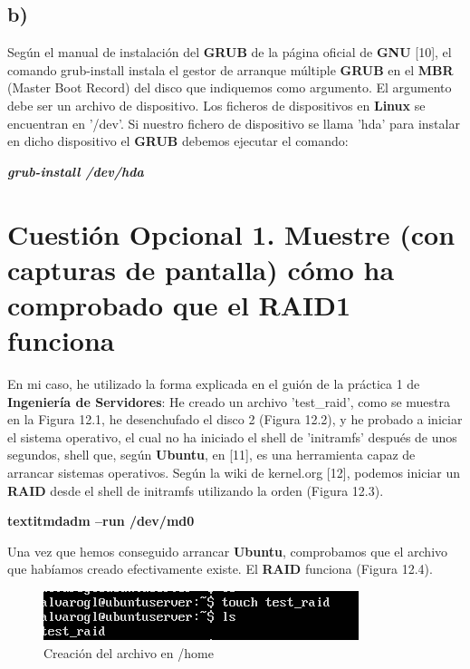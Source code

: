 \subsection{b)}
Según el manual de instalación del \textbf{GRUB} de la página oficial de \textbf{GNU} [10], el comando grub-install instala el gestor de arranque múltiple \textbf{GRUB} en el \textbf{MBR} (Master Boot Record) del disco que indiquemos como argumento. El argumento debe ser un archivo de dispositivo. Los ficheros de dispositivos en \textbf{Linux} se encuentran en '/dev'. Si nuestro fichero de dispositivo se llama 'hda' para instalar en dicho dispositivo el \textbf{GRUB} debemos ejecutar el comando:\newline

\textbf{\textit{grub-install /dev/hda}}




\section{Cuestión Opcional 1. Muestre (con capturas de pantalla) cómo ha comprobado que el RAID1 funciona}

En mi caso, he utilizado la forma explicada en el guión de la práctica 1 de \textbf{Ingeniería de Servidores}:
He creado un archivo 'test\_raid', como se muestra en la Figura 12.1, he desenchufado el disco 2 (Figura 12.2), y he probado a iniciar el sistema operativo, el cual no ha iniciado el shell de 'initramfs' después de unos segundos, shell que, según \textbf{Ubuntu}, en [11], es una herramienta capaz de arrancar sistemas operativos. Según la wiki de kernel.org [12], podemos iniciar un \textbf{RAID} desde el shell de initramfs utilizando la orden (Figura 12.3).

\textbf{textit{mdadm --run /dev/md0}}

Una vez que hemos conseguido arrancar \textbf{Ubuntu}, comprobamos que el archivo que habíamos creado efectivamente existe. El \textbf{RAID} funciona (Figura 12.4).

\begin{figure}[H] %
\centering
\includegraphics[scale=0.8]{cuestionopc1-creamosarchivohome.PNG}  %
\caption{Creación del archivo en /home} \label{fig:figura1}
\end{figure}

